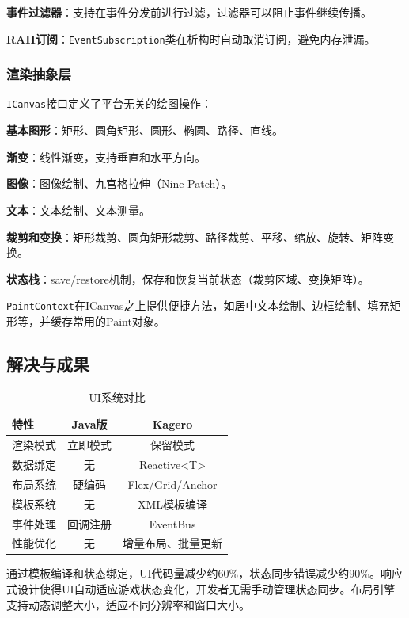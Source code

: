 \textbf{事件过滤器}：支持在事件分发前进行过滤，过滤器可以阻止事件继续传播。

\textbf{RAII订阅}：\texttt{EventSubscription}类在析构时自动取消订阅，避免内存泄漏。

\subsubsection{渲染抽象层}

\texttt{ICanvas}接口定义了平台无关的绘图操作：

\textbf{基本图形}：矩形、圆角矩形、圆形、椭圆、路径、直线。

\textbf{渐变}：线性渐变，支持垂直和水平方向。

\textbf{图像}：图像绘制、九宫格拉伸（Nine-Patch）。

\textbf{文本}：文本绘制、文本测量。

\textbf{裁剪和变换}：矩形裁剪、圆角矩形裁剪、路径裁剪、平移、缩放、旋转、矩阵变换。

\textbf{状态栈}：save/restore机制，保存和恢复当前状态（裁剪区域、变换矩阵）。

\texttt{PaintContext}在ICanvas之上提供便捷方法，如居中文本绘制、边框绘制、填充矩形等，并缓存常用的Paint对象。

\subsection{解决与成果}

\begin{table}[h]
\centering
\caption{UI系统对比}
\label{tab:ui_comparison}
\begin{tabular}{lcc}
\toprule
\textbf{特性} & \textbf{Java版} & \textbf{Kagero} \\
\midrule
渲染模式 & 立即模式 & 保留模式 \\
数据绑定 & 无 & Reactive<T> \\
布局系统 & 硬编码 & Flex/Grid/Anchor \\
模板系统 & 无 & XML模板编译 \\
事件处理 & 回调注册 & EventBus \\
性能优化 & 无 & 增量布局、批量更新 \\
\bottomrule
\end{tabular}
\end{table}

通过模板编译和状态绑定，UI代码量减少约60\%，状态同步错误减少约90\%。响应式设计使得UI自动适应游戏状态变化，开发者无需手动管理状态同步。布局引擎支持动态调整大小，适应不同分辨率和窗口大小。
